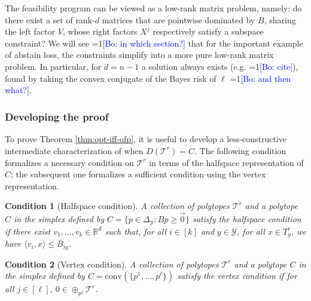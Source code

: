 \documentclass[anon]{colt2020} %
\newcommand{\Comments}{1}
\newcommand{\mynote}[2]{\ifnum\Comments=1\textcolor{#1}{#2}\fi}
\newcommand{\bo}[1]{\mynote{blue}{[Bo: #1]}}
\newcommand{\reals}{\mathbb{R}}
\newcommand{\simplex}{\Delta_\Y}
\newcommand{\T}{\mathcal{T}}
\newcommand{\Y}{\mathcal{Y}}
\newcommand{\inprod}[2]{\langle #1, #2 \rangle}%
\newcommand{\conv}{\mathrm{conv}}
\newtheorem{condition}{Condition}
\begin{document}
The feasibility program can be viewed as a low-rank matrix problem, namely: do there exist a set of rank-$d$ matrices that are pointwise dominated by $B$, sharing the left factor $V$, whose right factors $X^j$ respectively satisfy a subspace constraint?
We will see \bo{in which section?} that for the important example of abstain loss, the constraints simplify into a more pure low-rank matrix problem.
In particular, for $d=n-1$ a solution always exists (e.g. \bo{cite}), found by taking the convex conjugate of the Bayes risk of $\ell$ \bo{and then what?}.


\subsubsection{Developing the proof}

To prove Theorem \ref{thm:opt-iff-qfp}, it is useful to develop a less-constructive intermediate characterization of when $D(\T^r) = C$.
The following condition formalizes a necessary condition on $\T^r$ in terms of the halfspace representation of $C$; the subsequent one formalizes a sufficient condition using the vertex representation.


\begin{condition}[Halfspace condition]\label{cond:H-condition}
	A collection of polytopes $\T^r$ and a polytope $C$ in the simplex defined by $C = \{p \in \simplex : Bp \geq \vec 0\}$ \emph{satisfy the halfspace condition} if there exist $v_1, \ldots, v_k \in \reals^d$ such that, for all $i \in [k]$ and $y \in \Y$, for all $x \in T^r_y$, we have $\inprod{v_i}{x} \leq B_{iy}$.
\end{condition}
\begin{condition}[Vertex condition]\label{cond:V-condition}
	A collection of polytopes $\T^r$ and a polytope $C$ in the simplex defined by $C = \conv(\{p^1, \ldots, p^\ell\})$ \emph{satisfy the vertex condition} if for all $j \in [\ell]$, $0 \in \oplus_{p^j} \T^r$. %
\end{condition}
\end{document}
